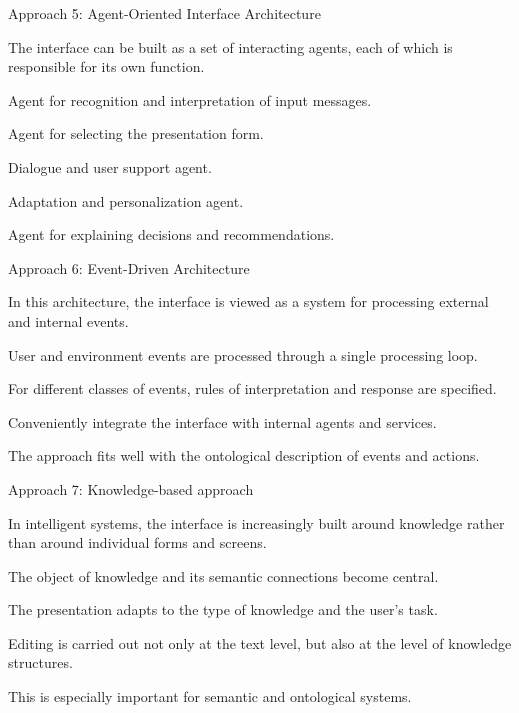 \begin{frame}{Approach 5: Agent-Oriented Interface Architecture}
	\topline
	\justifying
	
	The interface can be built as a set of interacting agents, each of which is responsible for its own function.
	
	\begin{textitemize}
		\item Agent for recognition and interpretation of input messages.
		\item Agent for selecting the presentation form.
		\item Dialogue and user support agent.
		\item Adaptation and personalization agent.
		\item Agent for explaining decisions and recommendations.
	\end{textitemize}
\end{frame}

\begin{frame}{Approach 6: Event-Driven Architecture}
	\topline
	\justifying
	
	In this architecture, the interface is viewed as a system for processing external and internal events.
	
	\begin{textitemize}
		\item User and environment events are processed through a single processing loop.
		\item For different classes of events, rules of interpretation and response are specified.
		\item Conveniently integrate the interface with internal agents and services.
		\item The approach fits well with the ontological description of events and actions.
	\end{textitemize}
\end{frame}

\begin{frame}{Approach 7: Knowledge-based approach}
	\topline
	\justifying
	
	In intelligent systems, the interface is increasingly built around knowledge rather than around individual forms and screens.
	
	\begin{textitemize}
		\item The object of knowledge and its semantic connections become central.
		\item The presentation adapts to the type of knowledge and the user's task.
		\item Editing is carried out not only at the text level, but also at the level of knowledge structures.
		\item This is especially important for semantic and ontological systems.
	\end{textitemize}
\end{frame}

